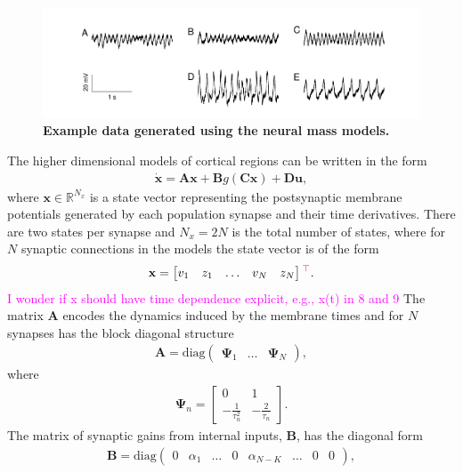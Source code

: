\documentclass{article}
\newcommand{\unit}[1]{\textcolor{magenta}{#1}}
\begin{document}
\begin{figure}[ht]
	\centering
		\includegraphics[scale=1]{./figures/pdf/Example_Data.pdf}
		\caption{\textbf{Example data generated using the neural mass models.}}
	\label{fig:NMMs}
\end{figure}

The higher dimensional models of cortical regions can be written in the form
\begin{align}
	\dot{\mathbf{x}} = \mathbf{A}\mathbf{x} + \mathbf{B} g\left(\mathbf{C}\mathbf{x}\right) + \mathbf{D}\mathbf{u},
\end{align}
where $\mathbf{x} \in \mathbb{R}^{N_x}$ is a state vector representing the postsynaptic membrane potentials generated by each population synapse and their time derivatives. There are two states per synapse and $N_x = 2N$ is the total number of states, where for $N$ synaptic connections in the models the state vector is of the form
\begin{align}
	\mathbf{x} = \begin{bmatrix} v_{1} & z_{1} & \hdots & v_{N} & z_{N}  \end{bmatrix}\unit{^\top}.
\end{align}
\unit{I wonder if x should have time dependence explicit, e.g., x(t) in 8 and 9}
The matrix $\mathbf{A}$ encodes the dynamics induced by the membrane times and for $N$ synapses has the block diagonal structure
\begin{align}
	\mathbf{A} = \mathrm{diag}\left(\begin{array}{ccc}\boldsymbol{\Psi}_1 & \hdots & \boldsymbol{\Psi}_N\end{array}\right),
\end{align}
where
\begin{align}
	\boldsymbol{\Psi}_n = \begin{bmatrix} 0 & 1 \\ -\frac{1}{\tau_n^2} & -\frac{2}{\tau_n} \end{bmatrix}.
\end{align}
The matrix of synaptic gains from internal inputs, $\mathbf{B}$, has the diagonal form 
\begin{align}
	\mathbf{B} = \mathrm{diag}\left(\begin{array}{cccccccc} 0 & \alpha_1 & \hdots & 0 & \alpha_{N-K} & \hdots & 0 & 0 \end{array}\right),
\end{align}
\end{document}
